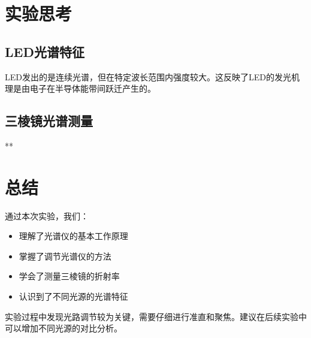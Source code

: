 \documentclass{ctexart}
\begin{document}
\section{实验思考}

\subsection{LED光谱特征}
LED发出的是连续光谱，但在特定波长范围内强度较大。这反映了LED的发光机理是由电子在半导体能带间跃迁产生的。

\subsection{三棱镜光谱测量}
**

\section{总结}

通过本次实验，我们：
\begin{itemize}
    \item 理解了光谱仪的基本工作原理
    \item 掌握了调节光谱仪的方法
    \item 学会了测量三棱镜的折射率
    \item 认识到了不同光源的光谱特征
\end{itemize}

实验过程中发现光路调节较为关键，需要仔细进行准直和聚焦。建议在后续实验中可以增加不同光源的对比分析。
\end{document}
